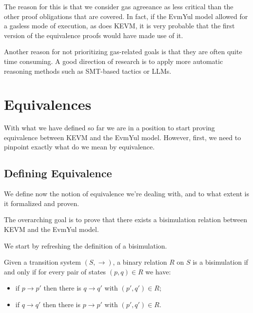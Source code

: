 The reason for this is that we consider gas agreeance as less critical than the other proof obligations that are covered.
In fact, if the EvmYul model allowed for a gasless mode of execution, as does KEVM, it is very probable that the first version of the equivalence proofs would have made use of it.

Another reason for not prioritizing gas-related goals is that they are often quite time consuming. A good direction of research is to apply more automatic reasoning methods such as SMT-based tactics or LLMs.


\chapter{Equivalences}\label{chap:equivalences}

With what we have defined so far we are in a position to start proving
equivalence between KEVM and the EvmYul model. However, first, we need to
pinpoint exactly what do we mean by equivalence.

\section{Defining Equivalence}

We define now the notion of equivalence we're dealing with, and to what extent
is it formalized and proven.

The overarching goal is to prove that there exists a bisimulation relation between
KEVM and the EvmYul model.

We start by refreshing the definition of a bisimulation.

\begin{definition}\label{def:bisimulation}
Given a transition system $(S, \rightarrow)$, a binary relation $R$ on $S$ is a
bisimulation if and only if for every pair of states $(p, q)\in R$ we have:
\begin{itemize}
\item if $p \rightarrow p'$ then there is $q \rightarrow q'$ with $(p', q') \in
  R$;
\item if $q \rightarrow q'$ then there is $p \rightarrow p'$ with $(p', q') \in
  R$.
\end{itemize}
\end{definition}

